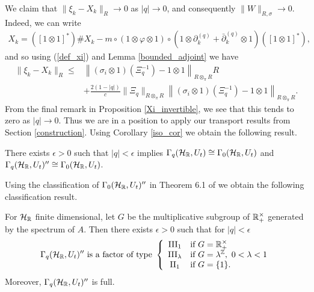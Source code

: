 We claim that $\|\xi_k - X_k\|_{R}\rightarrow 0 $ as $|q|\rightarrow 0$, and consequently $\|W\|_{R,\sigma}\rightarrow 0$. Indeed, we can write
	\begin{align*}
		X_k=\left(\left[1\otimes 1\right]^*\right)\# X_k - m\circ(1\otimes\varphi\otimes 1)\circ\left(1\otimes\partial_k^{(q)}+\bar{\partial}_k^{(q)}\otimes 1\right)\left( \left[1\otimes 1\right]^*\right),
	\end{align*}
and so using (\ref{def_xi}) and Lemma \ref{bounded_adjoint} we have
	\begin{align*}
		\|\xi_k - X_k\|_{R} \leq& \left\| (\sigma_i\otimes 1)(\Xi_q^{-1}) - 1\otimes 1 \right\|_{R\otimes_\pi R}R\\
			&+ \frac{2(1-|q|)}{c} \|\Xi_q\|_{R\otimes_\pi R}\left\| (\sigma_i\otimes 1)(\Xi_q^{-1}) - 1\otimes 1\right\|_{R\otimes_\pi R}.
	\end{align*}
From the final remark in Proposition \ref{Xi_invertible}, we see that this tends to zero as $|q|\rightarrow 0$. Thus we are in a position to apply our transport results from Section \ref{construction}. Using Corollary \ref{iso_cor} we obtain the following result.

\begin{thm}
There exists $\epsilon>0$ such that $|q|<\epsilon$ implies $\Gamma_q(\mathcal H_{\mathbb{R}},U_t)\cong \Gamma_0(\mathcal H_{\mathbb{R}},U_t)$ and $\Gamma_q(\mathcal H_{\mathbb{R}},U_t)''\cong\Gamma_0(\mathcal H_{\mathbb{R}},U_t)$.
\end{thm}

Using the classification of $\Gamma_0(\mathcal H_{\mathbb{R}},U_t)''$ in Theorem 6.1 of \cite{Shl97} we obtain the following classification result.

\begin{cor}
For $\mathcal H_{\mathbb{R}}$ finite dimensional, let $G$ be the multiplicative subgroup of $\mathbb{R}^\times_+$ generated by the spectrum of $A$. Then there exists $\epsilon>0$ such that for $|q|<\epsilon$
	\begin{align*}
		\Gamma_q(\mathcal H_{\mathbb{R}},U_t)''\text{ is a factor of type }\left\{\begin{array}{cl}	\mathrm{III}_1	&	\text{if }G=\mathbb{R}_+^\times\\
													\mathrm{III}_\lambda & 	\text{if }G=\lambda^{\mathbb{Z}},\ 0<\lambda<1\\
													\mathrm{II}_1		&	\text{if }G=\{1\}.\end{array}\right.
	\end{align*}
Moreover, $\Gamma_q(\mathcal H_{\mathbb{R}},U_t)''$ is full.
\end{cor}
